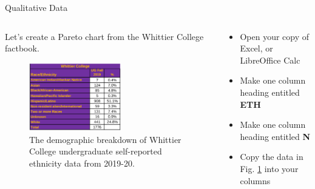 \documentclass{beamer}
\begin{document}
\begin{frame}{Qualitative Data}
\small
\begin{columns}[T]
\begin{column}{0.55\textwidth}
Let's create a Pareto chart from the Whittier College factbook.
\begin{figure}
\centering
\includegraphics[width=4cm]{figures/race4.png}
\caption{\label{fig:pareto2} The demographic breakdown of Whittier College undergraduate self-reported ethnicity data from 2019-20.}
\end{figure}
\end{column}
\begin{column}{0.45\textwidth}
\begin{itemize}
\item Open your copy of Excel, or LibreOffice Calc
\item Make one column heading entitled \textbf{ETH}
\item Make one column heading entitled \textbf{N}
\item Copy the data in Fig. \ref{fig:pareto2} into your columns
\end{itemize}
\end{column}
\end{columns}
\end{frame}
\end{document}
